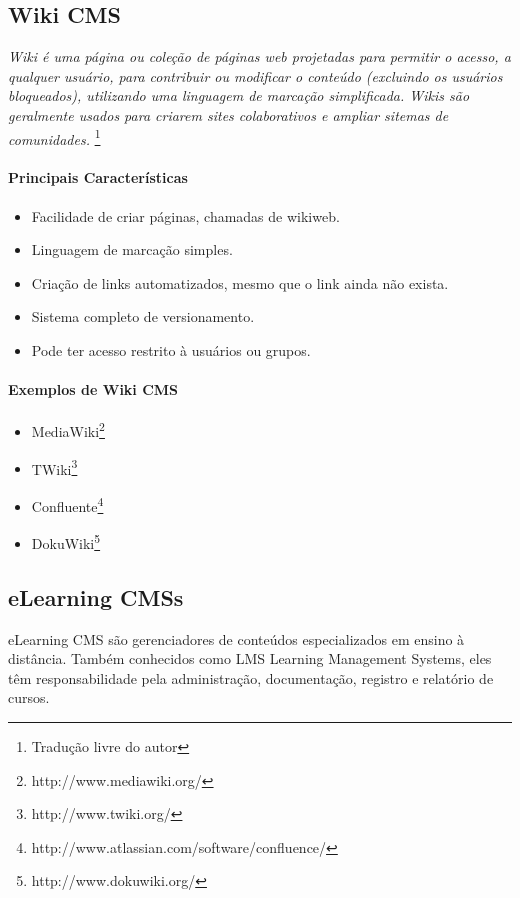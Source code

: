 \subsection{Wiki CMS} 

\emph{Wiki é uma página ou coleção de páginas web projetadas para permitir o acesso, a qualquer usuário, para contribuir ou modificar o conteúdo (excluindo os usuários bloqueados), utilizando uma linguagem de marcação simplificada. Wikis são geralmente usados para criarem sites colaborativos e ampliar sitemas de comunidades.}
\cite{choosing_open_source_cms}\footnote{Tradução livre do autor} 


\paragraph{Principais Características}

\begin{itemize}
  \item Facilidade de criar páginas, chamadas de wikiweb.
  \item Linguagem de marcação simples.
  \item Criação de links automatizados, mesmo que o link ainda não exista.
  \item Sistema completo de versionamento.
  \item Pode ter acesso restrito à usuários ou grupos.
\end{itemize}

\paragraph{Exemplos de Wiki CMS} 

\begin{itemize}
  \item MediaWiki\footnote{http://www.mediawiki.org/}
  \item TWiki\footnote{http://www.twiki.org/}
  \item Confluente\footnote{http://www.atlassian.com/software/confluence/}
  \item DokuWiki\footnote{http://www.dokuwiki.org/}
\end{itemize}


\subsection{eLearning CMSs} 

eLearning CMS são gerenciadores de conteúdos especializados em ensino à distância. Também conhecidos como LMS Learning Management Systems, eles têm responsabilidade pela administração, documentação, registro e relatório de cursos.
 
